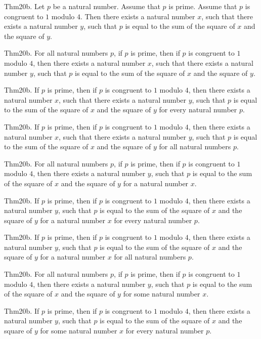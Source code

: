 \documentclass{article}
\begin{document}
Thm20b. Let $p$ be a natural number. Assume that $p$ is prime. Assume that $p$ is congruent to $1$ modulo $4$. Then there exists a natural number $x$, such that there exists a natural number $y$, such that $p$ is equal to the sum of the square of $x$ and the square of $y$.

Thm20b. For all natural numbers $p$, if $p$ is prime, then if $p$ is congruent to $1$ modulo $4$, then there exists a natural number $x$, such that there exists a natural number $y$, such that $p$ is equal to the sum of the square of $x$ and the square of $y$.

Thm20b. If $p$ is prime, then if $p$ is congruent to $1$ modulo $4$, then there exists a natural number $x$, such that there exists a natural number $y$, such that $p$ is equal to the sum of the square of $x$ and the square of $y$ for every natural number $p$.

Thm20b. If $p$ is prime, then if $p$ is congruent to $1$ modulo $4$, then there exists a natural number $x$, such that there exists a natural number $y$, such that $p$ is equal to the sum of the square of $x$ and the square of $y$ for all natural numbers $p$.

Thm20b. For all natural numbers $p$, if $p$ is prime, then if $p$ is congruent to $1$ modulo $4$, then there exists a natural number $y$, such that $p$ is equal to the sum of the square of $x$ and the square of $y$ for a natural number $x$.

Thm20b. If $p$ is prime, then if $p$ is congruent to $1$ modulo $4$, then there exists a natural number $y$, such that $p$ is equal to the sum of the square of $x$ and the square of $y$ for a natural number $x$ for every natural number $p$.

Thm20b. If $p$ is prime, then if $p$ is congruent to $1$ modulo $4$, then there exists a natural number $y$, such that $p$ is equal to the sum of the square of $x$ and the square of $y$ for a natural number $x$ for all natural numbers $p$.

Thm20b. For all natural numbers $p$, if $p$ is prime, then if $p$ is congruent to $1$ modulo $4$, then there exists a natural number $y$, such that $p$ is equal to the sum of the square of $x$ and the square of $y$ for some natural number $x$.

Thm20b. If $p$ is prime, then if $p$ is congruent to $1$ modulo $4$, then there exists a natural number $y$, such that $p$ is equal to the sum of the square of $x$ and the square of $y$ for some natural number $x$ for every natural number $p$.
\end{document}
